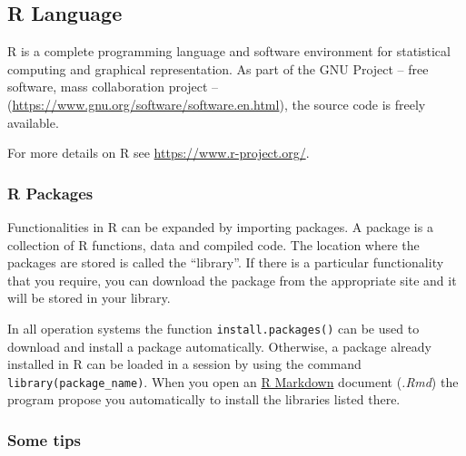 \documentclass[
]{article}
\begin{document}
\subsection{R Language}\label{r-language}

R is a complete programming language and software environment for statistical computing and graphical representation.
As part of the GNU Project -- free software, mass collaboration project -- (\url{https://www.gnu.org/software/software.en.html}), the source code is freely available.

For more details on R see \url{https://www.r-project.org/}.

\subsubsection{R Packages}\label{r-packages}

Functionalities in R can be expanded by importing packages.
A package is a collection of R functions, data and compiled code.
The location where the packages are stored is called the ``library''.
If there is a particular functionality that you require, you can download the package from the appropriate site and it will be stored in your library.

In all operation systems the function \texttt{install.packages()} can be used to download and install a package automatically.
Otherwise, a package already installed in R can be loaded in a session by using the command \texttt{library(package\_name)}.
When you open an \hyperref[r-markdown]{R Markdown} document (\emph{.Rmd}) the program propose you automatically to install the libraries listed there.

\subsubsection{Some tips}\label{some-tips}
\end{document}
